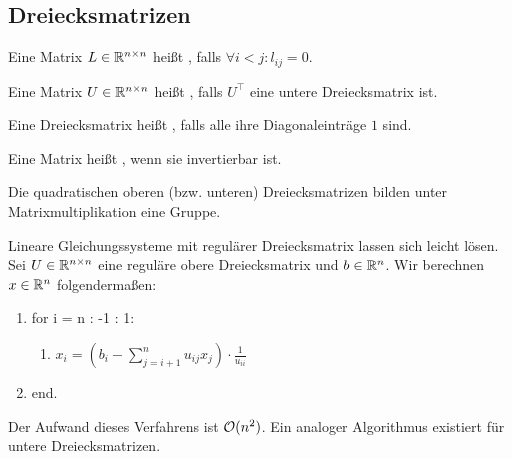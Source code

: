 \documentclass{report}
\begin{document}
\subsection{Dreiecksmatrizen}
\begin{definition}
	Eine Matrix $L \in \mathbb{R}^{n \times n}$ heißt , falls $\forall i < j : l_{ij} = 0$.
\end{definition}
\begin{definition}
	Eine Matrix $U \in \mathbb{R}^{n \times n}$ heißt , falls $U^\top$ eine untere Dreiecksmatrix ist.
\end{definition}
\begin{definition}
	Eine Dreiecksmatrix heißt , falls alle ihre Diagonaleinträge $1$ sind.
\end{definition}
\begin{definition}
	Eine Matrix heißt , wenn sie invertierbar ist.
\end{definition}
\begin{lemma}
	Die quadratischen oberen (bzw. unteren) Dreiecksmatrizen bilden unter Matrixmultiplikation eine Gruppe.
\end{lemma}
\noindent
Lineare Gleichungssysteme mit regulärer Dreiecksmatrix lassen sich leicht lösen. Sei $U \in \mathbb{R}^{n \times n}$ eine reguläre obere Dreiecksmatrix und $b \in \mathbb{R}^n$. Wir berechnen $x \in \mathbb{R}^n$ folgendermaßen:
\begin{enumerate}
	\item for i = n : -1 : 1:
	\begin{enumerate}
		\item $\displaystyle x_i = \left(b_i - \sum_{j = i+1}^n u_{ij}x_j\right) \cdot \frac{1}{u_{ii}}$
	\end{enumerate}
	\item end.
\end{enumerate}
Der Aufwand dieses Verfahrens ist $\mathcal{O}(n^2)$. Ein analoger Algorithmus existiert für untere Dreiecksmatrizen.
\end{document}
